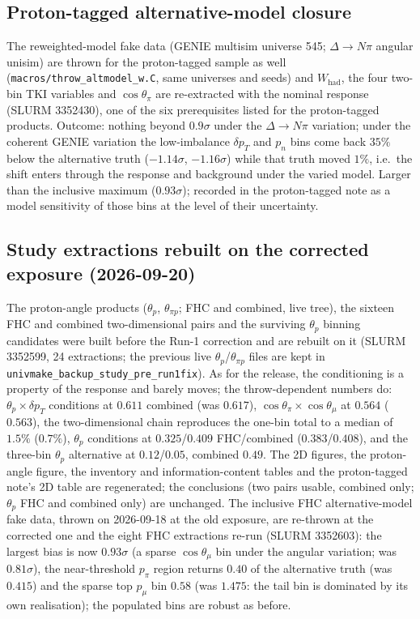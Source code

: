 \subsection{Proton-tagged alternative-model closure}
The reweighted-model fake data (GENIE multisim universe 545; $\Delta\to N\pi$ angular unisim) are
thrown for the proton-tagged sample as well (\texttt{macros/throw\_altmodel\_w.C}, same universes
and seeds) and $W_\mathrm{had}$, the four two-bin TKI variables and $\cos\theta_\pi$ are
re-extracted with the nominal response (SLURM 3352430), one of the six prerequisites listed for
the proton-tagged products. Outcome: nothing beyond $0.9\sigma$ under the $\Delta\to N\pi$
variation; under the coherent GENIE variation the low-imbalance $\delta p_T$ and $p_n$ bins come
back $35\%$ below the alternative truth ($-1.14\sigma$, $-1.16\sigma$) while that truth moved
$1\%$, i.e.\ the shift enters through the response and background under the varied model. Larger
than the inclusive maximum ($0.93\sigma$); recorded in the proton-tagged note as a model
sensitivity of those bins at the level of their uncertainty.

\subsection{Study extractions rebuilt on the corrected exposure (2026-09-20)}
The proton-angle products ($\theta_p$, $\theta_{\pi p}$; FHC and combined, live tree), the sixteen
FHC and combined two-dimensional pairs and the surviving $\theta_p$ binning candidates were built
before the Run-1 correction and are rebuilt on it (SLURM 3352599, 24 extractions; the previous
live $\theta_p$/$\theta_{\pi p}$ files are kept in \texttt{univmake\_backup\_study\_pre\_run1fix}).
As for the release, the conditioning is a property of the response and barely moves; the
throw-dependent numbers do: $\theta_p\times\delta p_T$ conditions at $0.611$ combined (was $0.617$),
$\cos\theta_\pi\times\cos\theta_\mu$ at $0.564$ ($0.563$), the two-dimensional chain reproduces the
one-bin total to a median of $1.5\%$ ($0.7\%$), $\theta_p$ conditions at $0.325$/$0.409$ FHC/combined
($0.383$/$0.408$), and the three-bin $\theta_p$ alternative at $0.12$/$0.05$, combined $0.49$. The
2D figures, the proton-angle figure, the inventory and information-content tables and the
proton-tagged note's 2D table are regenerated; the conclusions (two pairs usable, combined only;
$\theta_p$ FHC and combined only) are unchanged. The inclusive FHC alternative-model fake data,
thrown on 2026-09-18 at the old exposure, are re-thrown at the corrected one and the eight FHC
extractions re-run (SLURM 3352603): the largest bias is now $0.93\sigma$ (a sparse $\cos\theta_\mu$
bin under the angular variation; was $0.81\sigma$), the near-threshold $p_\pi$ region returns $0.40$
of the alternative truth (was $0.415$) and the sparse top $p_\mu$ bin $0.58$ (was $1.475$: the
tail bin is dominated by its own realisation); the populated bins are robust as before.

